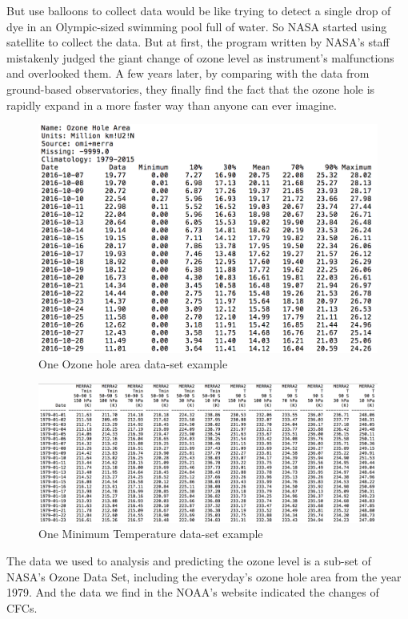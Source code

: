 \documentclass[12pt]{article}
\begin{document}
But use balloons to collect data would be like trying to detect a single drop of dye in an Olympic-sized swimming pool full of water. So NASA started using satellite to collect the data. But at first, the program written by NASA's staff mistakenly judged the giant change of ozone level as instrument's malfunctions and overlooked them. A few years later, by comparing with the data from ground-based observatories, they finally find the fact that the ozone hole is rapidly expand in a more faster way than anyone can ever imagine.
\begin{center}
\begin{figure}[htpb]
\centering
\includegraphics[scale=0.6]{oz_area_data}
\caption{One Ozone hole area data-set example}\label{fig:data}
\end{figure}

\begin{figure}[htpb]
\centering
\includegraphics[scale=0.4]{T&T_data}
\caption{One Minimum Temperature data-set example}\label{fig:data}
\end{figure}
\end{center}
The data we used to analysis and predicting the ozone level is a sub-set of NASA's Ozone Data Set, including the everyday's ozone hole area from the year 1979. And the data we find in the NOAA's website indicated the changes of CFCs.
\end{document}
